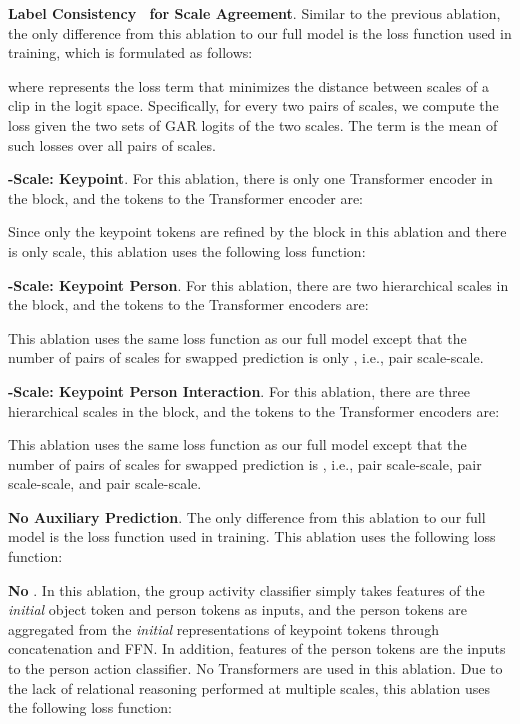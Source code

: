 \documentclass[runningheads]{llncs}
\begin{document}
\noindent \textbf{Label Consistency~\cite{shi2020online} for Scale Agreement}. Similar to the previous ablation, the only difference from this ablation to our full model \ours is the loss function used in training, which is formulated as follows:

where  represents the loss term that minimizes the  distance between  scales of a clip in the logit space. Specifically, for every two pairs of scales, we compute the  loss given the two sets of GAR logits of the two scales. The   term is the mean of such  losses over all pairs of scales.

\noindent \textbf{-Scale: Keypoint}. 
For this ablation, there is only one Transformer encoder in the \mtx block, and the tokens to the Transformer encoder are:

Since only the keypoint tokens are refined by the \mtx block in this ablation and there is only  scale, this ablation uses the following loss function:
  

\noindent \textbf{-Scale: Keypoint  Person}. 
For this ablation, there are two hierarchical scales in the \mtx block, and the tokens to the Transformer encoders are:

This ablation uses the same loss function as our full model except that the number of pairs of scales for swapped prediction 
is only , i.e., pair scale-scale.

 

\noindent \textbf{-Scale: Keypoint  Person  Interaction}. 
For this ablation, there are three hierarchical scales in the \mtx block, and the tokens to the Transformer encoders are:

This ablation uses the same loss function as our full model except that the number of pairs of scales for swapped prediction 
is , i.e., pair scale-scale, pair scale-scale, and pair scale-scale.

\noindent \textbf{No Auxiliary Prediction}. The only difference from this ablation to our full model \ours is the loss function used in training. 
This ablation uses the following loss function:


\noindent \textbf{No \mtxeos}. In this ablation, the group activity classifier simply takes features of the \textit{initial} object token and person tokens as inputs, and the person tokens are aggregated from the \textit{initial} representations of keypoint tokens through concatenation and FFN. In addition, features of the person tokens are the inputs to the person action classifier.
No Transformers are used in this ablation.  Due to the lack of relational reasoning performed at multiple scales, this ablation uses the following loss function:
\end{document}
